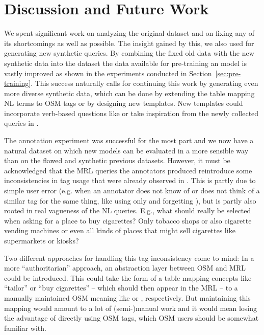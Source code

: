 \chapter{Discussion and Future Work}
\label{ch:discussion}

We spent significant work on analyzing the original \nlmapstwo{} dataset and on
fixing any of its shortcomings as well as possible. The insight gained by this,
we also used for generating new synthetic queries. By combining the fixed old
data with the new synthetic data into the \nlmapsthree{} dataset the data
available for pre-training an \nlmaps{} model is vastly improved as shown in the
experiments conducted in Section~\ref{sec:pre-training}. This success naturally
calls for continuing this work by generating even more diverse synthetic data,
which can be done by extending the table mapping NL terms to OSM tags or by
designing new templates. New templates could incorporate verb-based questions
like  or take inspiration from the newly
collected queries in \nlmapsfour{}.

The annotation experiment was successful for the most part and we now have a
natural dataset on which new \nlmaps{} models can be evaluated in a more
sensible way than on the flawed and synthetic previous datasets. However, it
must be acknowledged that the MRL queries the annotators produced reintroduce
some inconsistencies in tag usage that were already observed in \nlmapstwo{}.
This is partly due to simple user error (e.g. when an annotator does not know of
or does not think of a similar tag for the same thing, like using only
 and forgetting ), but is partly also
rooted in real vagueness of the NL queries. E.g., what should really be selected
when asking for a place to buy cigarettes? Only tobacco shops or also cigarette
vending machines or even all kinds of places that might sell cigarettes like
supermarkets or kiosks?

Two different approaches for handling this tag inconsistency come to mind: In a
more \enquote{authoritarian} approach, an abstraction layer between OSM and MRL
could be introduced. This could take the form of a table mapping concepts like
\enquote{tailor} or \enquote{buy cigarettes} – which should then appear in the
MRL – to a manually maintained OSM meaning like 
 or  ,
respectively. But maintaining this mapping would amount to a lot of
(semi-)manual work and it would mean losing the advantage of directly using OSM
tags, which OSM users should be somewhat familiar with.

